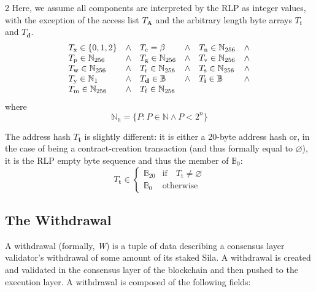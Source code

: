 \documentclass[9pt,oneside]{amsart}
\makeatletter
\newcommand{\linkdest}[1]{\Hy@raisedlink{\hypertarget{#1}{}}}
\makeatother
\begin{document}
\begin{multicols}{2}
Here, we assume all components are interpreted by the RLP as integer values, with the exception of the access list $T_{\mathbf{A}}$ and the arbitrary length byte arrays $T_{\mathbf{i}}$ and $T_{\mathbf{d}}$.
\begin{equation}
\begin{array}[t]{lclclc}
T_{\mathrm{x}} \in \{0, 1, 2\} & \wedge & T_{\mathrm{c}} = \beta & \wedge & T_{\mathrm{n}} \in \mathbb{N}_{256} & \wedge \\
T_{\mathrm{p}} \in \mathbb{N}_{256} & \wedge & T_{\mathrm{g}} \in \mathbb{N}_{256} & \wedge & T_{\mathrm{v}} \in \mathbb{N}_{256} & \wedge \\
T_{\mathrm{w}} \in \mathbb{N}_{256} & \wedge & T_{\mathrm{r}} \in \mathbb{N}_{256} & \wedge & T_{\mathrm{s}} \in \mathbb{N}_{256} & \wedge \\
T_{\mathrm{y}} \in \mathbb{N}_{1} & \wedge & T_{\mathbf{d}} \in \mathbb{B} & \wedge & T_{\mathbf{i}} \in \mathbb{B} & \wedge \\
T_{\mathrm{m}} \in \mathbb{N}_{256} & \wedge & T_{\mathrm{f}} \in \mathbb{N}_{256}
\end{array}
\end{equation}
where
\begin{equation}
\mathbb{N}_{\mathrm{n}} = \{ P: P \in \mathbb{N} \wedge P < 2^n \}
\end{equation}

The address hash $T_{\mathbf{t}}$ is slightly different: it is either a 20-byte address hash or, in the case of being a contract-creation transaction (and thus formally equal to $\varnothing$), it is the RLP empty byte sequence and thus the member of $\mathbb{B}_0$:
\begin{equation}
T_{\mathbf{t}} \in \begin{cases} \mathbb{B}_{20} & \text{if} \quad T_{\mathrm{t}} \neq \varnothing \\
\mathbb{B}_{0} & \text{otherwise}\end{cases}
\end{equation}

\subsection{The Withdrawal}\linkdest{withdrawal}\label{subsec:The_Withdrawal}
A withdrawal (formally, \textit{W}) is a tuple of data describing a consensus layer validator's withdrawal of some amount of its staked Sila.
A withdrawal is created and validated in the consensus layer of the blockchain and then pushed to the execution layer.
A withdrawal is composed of the following fields:


\end{multicols}
\end{document}

